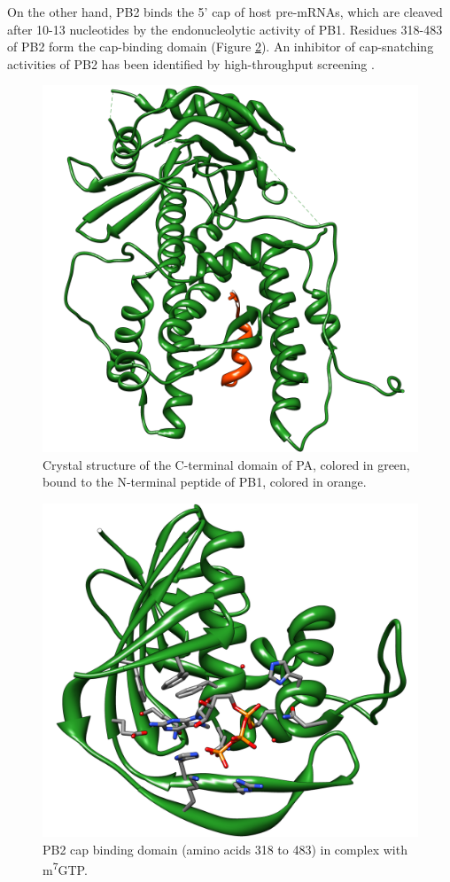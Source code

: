 On the other hand, PB2 binds the 5' cap of host pre-mRNAs, which are cleaved after 10-13 nucleotides by the endonucleolytic activity of PB1. Residues 318-483 of PB2 form the cap-binding domain (Figure \ref{influenza:2VQZ}). An inhibitor of cap-snatching activities of PB2 has been identified by high-throughput screening \citep{1236}.

\begin{figure}
\centering
\includegraphics[width=\linewidth]{../influenza/2ZNL.png}
\caption{Crystal structure of the C-terminal domain of PA, colored in green, bound to the N-terminal peptide of PB1, colored in orange.}
\label{influenza:2ZNL}
\end{figure}

\begin{figure}
\centering
\includegraphics[width=\linewidth]{../influenza/2VQZ.png}
\caption{PB2 cap binding domain (amino acids 318 to 483) in complex with m\textsuperscript{7}GTP.}
\label{influenza:2VQZ}
\end{figure}

